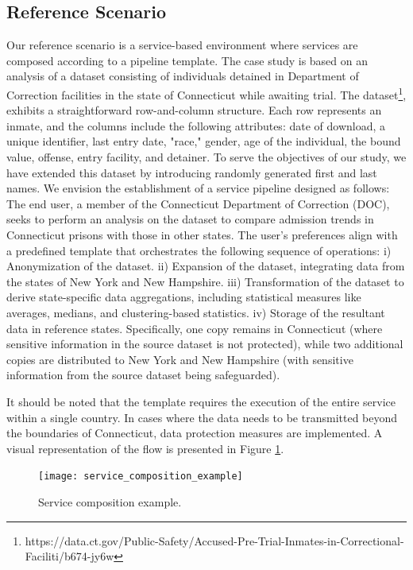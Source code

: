 \subsection{Reference Scenario}\label{sec:reference}
Our reference scenario is a service-based environment where services are composed according to a pipeline template.
The case study is based on an analysis of a dataset consisting of individuals detained in Department of Correction facilities in the state of Connecticut while awaiting trial.
The dataset\footnote{https://data.ct.gov/Public-Safety/Accused-Pre-Trial-Inmates-in-Correctional-Faciliti/b674-jy6w}, exhibits a straightforward row-and-column structure.
Each row represents an inmate, and the columns include the following attributes: date of download, a unique identifier, last entry date, "race," gender, age of the individual, the bound value, offense, entry facility, and detainer.
To serve the objectives of our study, we have extended this dataset by introducing randomly generated first and last names.
We envision the establishment of a service pipeline designed as follows:
The end user, a member of the Connecticut Department of Correction (DOC),
seeks to perform an analysis on the dataset to compare admission trends in Connecticut prisons with those in other states.
The user's preferences align with a predefined template that orchestrates the following sequence of operations:
i) Anonymization of the dataset.
ii) Expansion of the dataset, integrating data from the states of New York and New Hampshire.
iii) Transformation of the dataset to derive state-specific data aggregations, including statistical measures like averages, medians, and clustering-based statistics.
iv) Storage of the resultant data in reference states. Specifically, one copy remains in Connecticut (where sensitive information in the source dataset is not protected), while two additional copies are distributed to New York and New Hampshire (with sensitive information from the source dataset being safeguarded).

It should be noted that the template requires the execution of the entire service within a single country.
In cases where the data needs to be transmitted beyond the boundaries of Connecticut, data protection measures are implemented.
A visual representation of the flow is presented in Figure \ref{fig:service_composition_example}.

\begin{figure}
  \texttt{[image: service\_composition\_example]}
  \caption{Service composition example.}\label{fig:service_composition_example}

\end{figure}



